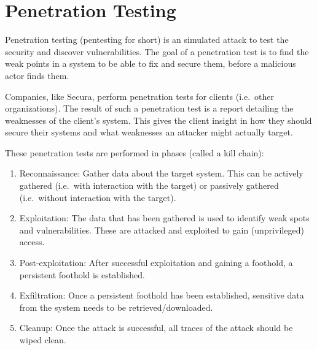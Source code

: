 \section{Penetration Testing}
Penetration testing (pentesting for short) is an simulated attack to test the security and discover vulnerabilities. The goal of a penetration test is to find the weak points in a system to be able to fix and secure them, before a malicious actor finds them.

Companies, like Secura, perform penetration tests for clients (i.e.\ other organizations). The result of such a penetration test is a report detailing the weaknesses of the client's system. This gives the client insight in how they should secure their systems and what weaknesses an attacker might actually target.

These penetration tests are performed in phases (called a kill chain):
\begin{enumerate}
    \item Reconnaissance: Gather data about the target system. This can be actively gathered (i.e.\ with interaction with the target) or passively gathered (i.e.\ without interaction with the target).
    \item Exploitation: The data that has been gathered is used to identify weak spots and vulnerabilities. These are attacked and exploited to gain (unprivileged) access.
    \item Post-exploitation: After successful exploitation and gaining a foothold, a persistent foothold is established.
    \item Exfiltration: Once a persistent foothold has been established, sensitive data from the system needs to be retrieved/downloaded.
    \item Cleanup: Once the attack is successful, all traces of the attack should be wiped clean.
\end{enumerate}

\hfill

